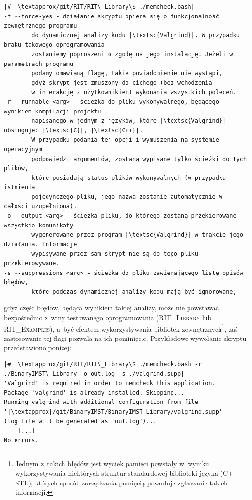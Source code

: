 \begin{verbatim}
|# :\textapprox/git/RIT/RIT\_Library\$ ./memcheck.bash|
-f --force-yes - działanie skryptu opiera się o funkcjonalność zewnętrznego programu 
		do dynamicznej analizy kodu |\textsc{Valgrind}|. W przypadku braku takowego oprogramowania 
		zostaniemy poproszeni o zgodę na jego instalację. Jeżeli w parametrach programu
		podamy omawianą flagę, takie powiadomienie nie wystąpi, 
		gdyż skrypt jest zmuszony do cichego (bez wchodzenia 
		w interakcję z użytkownikiem) wykonania wszystkich poleceń.
-r --runnable <arg> - ścieżka do pliku wykonywalnego, będącego wynikiem kompilacji projektu 
		napisanego w jednym z języków, które |\textsc{Valgrind}| obsługuje: |\textsc{C}|, |\textsc{C++}|. 
		W przypadku podania tej opcji i wymuszenia na systemie operacyjnym 
		podpowiedzi argumentów, zostaną wypisane tylko ścieżki do tych plików, 
		które posiadają status plików wykonywalnych (w przypadku istnienia 
		pojedynczego pliku, jego nazwa zostanie automatycznie w całości uzupełniona).
-o --output <arg> - ścieżka pliku, do którego zostaną przekierowane wszystkie komunikaty 
		wygenerowane przez program |\textsc{Valgrind}| w trakcie jego działania. Informacje
		wypisywane przez sam skrypt nie są do tego pliku przekierowywane.
-s --suppressions <arg> - ścieżka do pliku zawierającego listę opisów błędów, 
		które podczas dynamicznej analizy kodu mają być ignorowane,
\end{verbatim}
gdyż część błędów, będąca wynikiem takiej analizy, może nie powstawać bezpośrednio z~winy testowanego oprogramowania (\textsc{RIT\_Library} lub \textsc{RIT\_Examples}), a~być efektem wykorzystywania bibliotek zewnętrznych\footnote{Jednym z~takich błędów jest wyciek pamięci powstały w~wyniku wykorzystywania niektórych struktur standardowej biblioteki języka (\textsc{C++ STL}), których sposób zarządzania pamięcią powoduje zgłaszanie takich informacji.}, zaś zastosowanie tej flagi pozwala na ich pominięcie. Przykładowe wywołanie skryptu przedstawiono poniżej:

\begin{verbatim}
|# :\textapprox/git/RIT/RIT\_Library\$ ./memcheck.bash -r ./BinaryIMST\_Library -o out.log -s ./valgrind.supp|
'Valgrind' is required in order to memcheck this application.
Package 'valgrind' is already installed. Skipping...
Running valgrind with additional configuration from file 
'|\textapprox|/git/BinaryIMST/BinaryIMST_Library/valgrind.supp' 
(log file will be generated as 'out.log')...
	[...]
No errors.
\end{verbatim}

